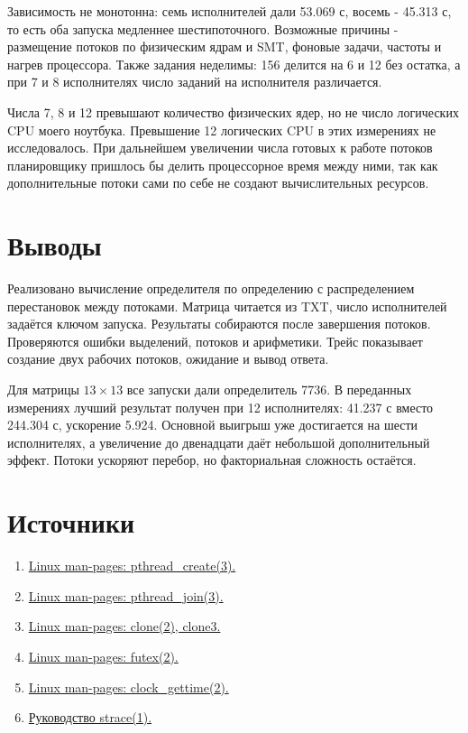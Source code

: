 \documentclass[12pt,a4paper]{article}
\begin{document}
Зависимость не монотонна: семь исполнителей дали 53.069 с, восемь - 45.313 с, то есть оба запуска медленнее шестипоточного. Возможные причины - размещение потоков по физическим ядрам и SMT, фоновые задачи, частоты и нагрев процессора. Также задания неделимы: 156 делится на 6 и 12 без остатка, а при 7 и 8 исполнителях число заданий на исполнителя различается.

Числа 7, 8 и 12 превышают количество физических ядер, но не число логических CPU моего ноутбука. Превышение 12 логических CPU в этих измерениях не исследовалось. При дальнейшем увеличении числа готовых к работе потоков планировщику пришлось бы делить процессорное время между ними, так как дополнительные потоки сами по себе не создают вычислительных ресурсов.

\section{Выводы}
Реализовано вычисление определителя по определению с распределением перестановок между потоками. Матрица читается из TXT, число исполнителей задаётся ключом запуска. Результаты собираются после завершения потоков. Проверяются ошибки выделений, потоков и арифметики. Трейс показывает создание двух рабочих потоков, ожидание и вывод ответа.

Для матрицы $13\times13$ все запуски дали определитель 7736. В переданных измерениях лучший результат получен при 12 исполнителях: 41.237 с вместо 244.304 с, ускорение 5.924. Основной выигрыш уже достигается на шести исполнителях, а увеличение до двенадцати даёт небольшой дополнительный эффект. Потоки ускоряют перебор, но факториальная сложность остаётся.

\section{Источники}
\begin{enumerate}
\item \href{https://man7.org/linux/man-pages/man3/pthread_create.3.html}{Linux man-pages: pthread\_create(3).}
\item \href{https://man7.org/linux/man-pages/man3/pthread_join.3.html}{Linux man-pages: pthread\_join(3).}
\item \href{https://man7.org/linux/man-pages/man2/clone.2.html}{Linux man-pages: clone(2), clone3.}
\item \href{https://man7.org/linux/man-pages/man2/futex.2.html}{Linux man-pages: futex(2).}
\item \href{https://man7.org/linux/man-pages/man2/clock_gettime.2.html}{Linux man-pages: clock\_gettime(2).}
\item \href{https://man7.org/linux/man-pages/man1/strace.1.html}{Руководство strace(1).}
\end{enumerate}
\end{document}
